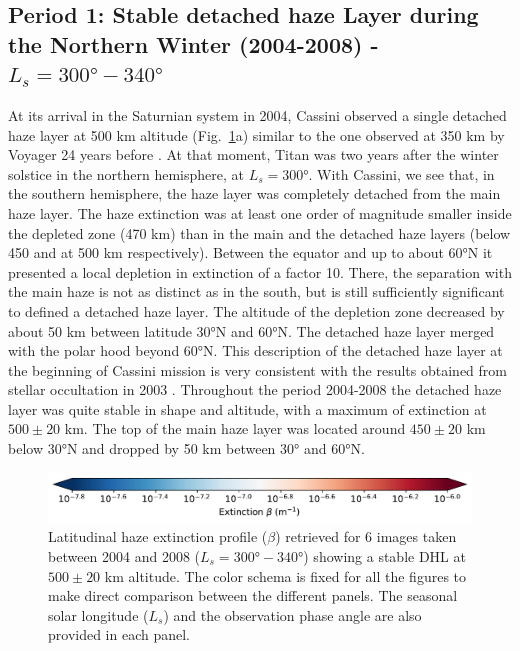 \subsection{Period 1: Stable detached haze Layer during the Northern Winter (2004-2008) - $L_s=\ang{300}-\ang{340}$}

At its arrival in the Saturnian system in 2004, Cassini observed a single detached haze layer at 500 km altitude
(Fig.~\ref{fig:dhl_2004_2008}a) similar to the one observed at 350 km by Voyager 24 years before
\citep{Smith1981}. At that moment, Titan was two years after the winter solstice in the northern hemisphere, at $L_s=\ang{300}$.
With Cassini, we see that, in the southern hemisphere, the haze layer was completely detached from the main haze layer.
The haze extinction was at least one order of magnitude smaller inside the depleted zone (470 km) than in the main and
the detached haze layers (below 450 and at 500 km respectively).
Between the equator and up to about \ang{60}N it presented a local depletion in extinction
of a factor 10. There, the separation with the main haze is not as distinct as in the south, but is still sufficiently significant to
defined a detached haze layer.
The altitude of the depletion zone decreased by about 50 km between latitude \ang{30}N  and \ang{60}N.
The detached haze layer merged with the polar hood beyond \ang{60}N. This description of the detached haze layer at
the beginning of Cassini mission is very consistent with the results obtained from stellar occultation in 2003 \citep{Sicardy2006}.
Throughout the period 2004-2008 the detached haze layer was quite stable in shape and  altitude, with a maximum of extinction
at $500 \pm 20$ km. The top of the main haze layer was located around $450 \pm 20$ km below \ang{30}N and dropped
by 50 km between \ang{30} and \ang{60}N.

\begin{figure}[!ht]
\includegraphics[width=.5\textwidth]{Fig/Extinction_colorbar}
\caption{Latitudinal haze extinction profile ($\beta$) retrieved for 6 images taken between 2004 and 2008
($L_s=\ang{300}-\ang{340}$) showing a stable DHL at $500 \pm 20$ km altitude.
The color schema is fixed for all the figures to make direct comparison
between the different panels. The seasonal solar longitude ($L_s$) and the observation phase angle are
also provided in each panel.}
\label{fig:dhl_2004_2008}
\end{figure}

